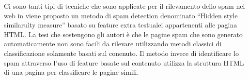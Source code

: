 Ci sono tanti tipi di tecniche che sono applicate per il rilevamento dello spam nel web in \cite{DBLP:conf:airweb:UrvoyLF06} viene proposto un metodo di spam detection denominato ``Hidden style similaruìty measure'' basato su feature extra testualei appartenenti alle pagina HTML. La tesi che sostengono gli autori è che le pagine spam che sono generato automaticamente non sono facili da rilevare utilizzando metodi classici di classificazione solamente basati sul conenuto. Il metodo invece di identificare lo spam  attraverso l'uso di feature basate sul contenuto  utilizza la struttura HTML di una pagina per classificare le pagine simili.




